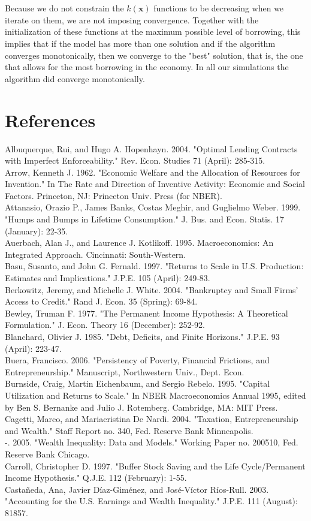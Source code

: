 \documentclass[10pt]{article}
\begin{document}
Because we do not constrain the $\hat{k}(\boldsymbol{x})$ functions to be decreasing when we iterate on them, we are not imposing convergence. Together with the initialization of these functions at the maximum possible level of borrowing, this implies that if the model has more than one solution and if the algorithm converges monotonically, then we converge to the "best" solution, that is, the one that allows for the most borrowing in the economy. In all our simulations the algorithm did converge monotonically.

\section*{References}
Albuquerque, Rui, and Hugo A. Hopenhayn. 2004. "Optimal Lending Contracts with Imperfect Enforceability." Rev. Econ. Studies 71 (April): 285-315.\\
Arrow, Kenneth J. 1962. "Economic Welfare and the Allocation of Resources for Invention." In The Rate and Direction of Inventive Activity: Economic and Social Factors. Princeton, NJ: Princeton Univ. Press (for NBER).\\
Attanasio, Orazio P., James Banks, Costas Meghir, and Guglielmo Weber. 1999. "Humps and Bumps in Lifetime Consumption." J. Bus. and Econ. Statis. 17 (January): 22-35.\\
Auerbach, Alan J., and Laurence J. Kotlikoff. 1995. Macroeconomics: An Integrated Approach. Cincinnati: South-Western.\\
Basu, Susanto, and John G. Fernald. 1997. "Returns to Scale in U.S. Production: Estimates and Implications." J.P.E. 105 (April): 249-83.\\
Berkowitz, Jeremy, and Michelle J. White. 2004. "Bankruptcy and Small Firms' Access to Credit." Rand J. Econ. 35 (Spring): 69-84.\\
Bewley, Truman F. 1977. "The Permanent Income Hypothesis: A Theoretical Formulation." J. Econ. Theory 16 (December): 252-92.\\
Blanchard, Olivier J. 1985. "Debt, Deficits, and Finite Horizons." J.P.E. 93 (April): 223-47.\\
Buera, Francisco. 2006. "Persistency of Poverty, Financial Frictions, and Entrepreneurship." Manuscript, Northwestern Univ., Dept. Econ.\\
Burnside, Craig, Martin Eichenbaum, and Sergio Rebelo. 1995. "Capital Utilization and Returns to Scale." In NBER Macroeconomics Annual 1995, edited by Ben S. Bernanke and Julio J. Rotemberg. Cambridge, MA: MIT Press.\\
Cagetti, Marco, and Mariacristina De Nardi. 2004. "Taxation, Entrepreneurship and Wealth." Staff Report no. 340, Fed. Reserve Bank Minneapolis.\\
-. 2005. "Wealth Inequality: Data and Models." Working Paper no. 200510, Fed. Reserve Bank Chicago.\\
Carroll, Christopher D. 1997. "Buffer Stock Saving and the Life Cycle/Permanent Income Hypothesis." Q.J.E. 112 (February): 1-55.\\
Castañeda, Ana, Javier Díaz-Giménez, and José-Víctor Ríos-Rull. 2003. "Accounting for the U.S. Earnings and Wealth Inequality." J.P.E. 111 (August): 81857.
\end{document}
